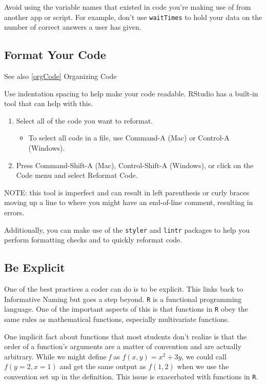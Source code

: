 \documentclass[]{book}
\providecommand{\tightlist}{%
  \setlength{\itemsep}{0pt}\setlength{\parskip}{0pt}}
\begin{document}
Avoid using the variable names that existed in code you're making use of from another app or script. For example, don't use \texttt{waitTimes} to hold your data on the number of correct answers a user has given.

\hypertarget{formatCode}{%
\subsection{Format Your Code}\label{formatCode}}

See also \ref{orgCode} Organizing Code

Use indentation spacing to help make your code readable. RStudio has a built-in tool that can help with this.

\begin{enumerate}
\def\labelenumi{\arabic{enumi}.}
\tightlist
\item
  Select all of the code you want to reformat.

  \begin{itemize}
  \tightlist
  \item
    To select all code in a file, use Command-A (Mac) or Control-A (Windows).
  \end{itemize}
\item
  Press Command-Shift-A (Mac), Control-Shift-A (Windows), or click on the Code menu and select Reformat Code.
\end{enumerate}

NOTE: this tool is imperfect and can result in left parenthesis or curly braces moving up a line to where you might have an end-of-line comment, resulting in errors.

Additionally, you can make use of the \texttt{styler} and \texttt{lintr} packages to help you perform formatting checks and to quickly reformat code.

\hypertarget{explicit}{%
\subsection{Be Explicit}\label{explicit}}

One of the best practices a coder can do is to be explicit. This links back to Informative Naming but goes a step beyond. \texttt{R} is a functional programming language. One of the important aspects of this is that functions in \texttt{R} obey the same rules as mathematical functions, especially multivariate functions.

One implicit fact about functions that most students don't realize is that the order of a function's arguments are a matter of convention and are actually arbitrary. While we might define \emph{f} as \(f(x,y) = x^2+3y\), we could call \(f(y=2,x=1)\) and get the same output as \(f(1,2)\) when we use the convention set up in the definition. This issue is exacerbated with functions in \texttt{R}.
\end{document}
